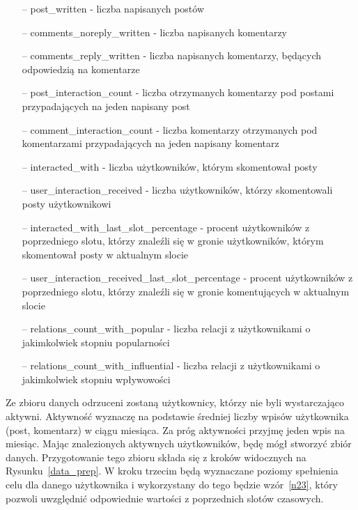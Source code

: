 \documentclass[polish,12pt]{aghthesis}
\begin{document}
\begin{itemize}
    \setlength\itemsep{0,1em}
    \item[--] post\_written - liczba napisanych postów
    \item[--] comments\_noreply\_written - liczba napisanych komentarzy 
    \item[--] comments\_reply\_written - liczba napisanych komentarzy, będących odpowiedzią na komentarze 
    \item[--] post\_interaction\_count - liczba otrzymanych komentarzy pod postami przypadających na jeden napisany post 
    \item[--] comment\_interaction\_count - liczba komentarzy otrzymanych pod komentarzami przypadających na jeden napisany komentarz 
    \item[--] interacted\_with - liczba użytkowników, którym skomentował posty 
    \item[--] user\_interaction\_received - liczba użytkowników, którzy skomentowali posty użytkownikowi 
    \item[--] interacted\_with\_last\_slot\_percentage - procent użytkowników z poprzedniego slotu, którzy znaleźli się w gronie użytkowników, którym skomentował posty w aktualnym slocie
    \item[--] user\_interaction\_received\_last\_slot\_percentage - procent użytkowników z poprzedniego slotu, którzy znaleźli się w gronie komentujących w aktualnym slocie 
    \item[--] relations\_count\_with\_popular - liczba relacji z użytkownikami o jakimkolwiek stopniu popularności 
    \item[--] relations\_count\_with\_influential - liczba relacji z użytkownikami o jakimkolwiek stopniu wpływowości

\end{itemize}


Ze zbioru danych odrzuceni zostaną użytkownicy, którzy nie byli wystarczająco aktywni. Aktywność wyznaczę na podstawie średniej liczby wpisów użytkownika (post, komentarz) w ciągu miesiąca. Za próg aktywności przyjmę jeden wpis na miesiąc. Mając znalezionych aktywnych użytkowników, będę mógł stworzyć zbiór danych. Przygotowanie tego zbioru składa się z kroków widocznych na Rysunku~\ref{data_prep}. W kroku trzecim będą wyznaczane poziomy spełnienia celu dla danego użytkownika i wykorzystany do tego będzie wzór~\ref{n23}, który pozwoli uwzględnić odpowiednie wartości z poprzednich slotów czasowych.
\end{document}
